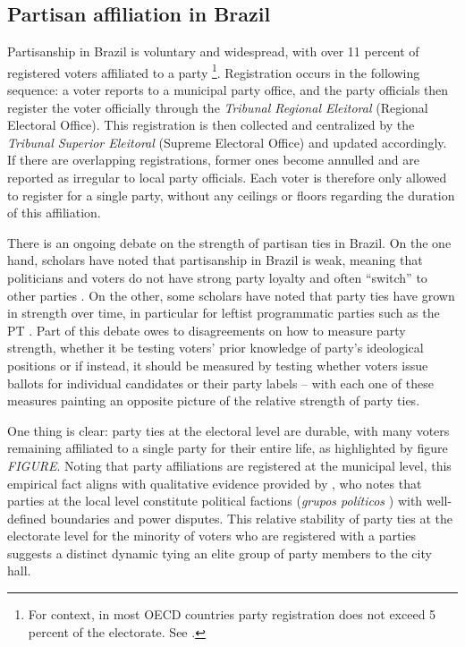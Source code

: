\subsection{Partisan affiliation in Brazil}

Partisanship in Brazil is voluntary and widespread, with over 11 percent of registered voters affiliated to a party \citep{speck2015estudo}\footnote{For context, in most OECD countries party registration does not exceed 5 percent of the electorate. See \citet{biezen2014decline}.}. Registration occurs in the following sequence: a voter reports to a municipal party office, and the party officials then register the voter officially through the \emph{Tribunal Regional Eleitoral} (Regional Electoral Office). This registration is then collected and centralized by the \emph{Tribunal Superior Eleitoral} (Supreme Electoral Office) and updated accordingly. If there are overlapping registrations, former ones become annulled and are reported as irregular to local party officials. Each voter is therefore only allowed to register for a single party, without any ceilings or floors regarding the duration of this affiliation.

There is an ongoing debate on the strength of partisan ties in Brazil. On the one hand, scholars have noted that partisanship in Brazil is weak, meaning that politicians and voters do not have strong party loyalty and often ``switch'' to other parties \citep{desposato2006parties,ames2002deadlock}. On the other, some scholars have noted that party ties have grown in strength over time, in particular for leftist programmatic parties such as the PT \citep{samuels2014power,samuels2006sources}. Part of this debate owes to disagreements on how to measure party strength, whether it be testing voters' prior knowledge of party's ideological positions or if instead, it should be measured by testing whether voters issue ballots for individual candidates or their party labels -- with each one of these measures painting an opposite picture of the relative strength of party ties.

One thing is clear: party ties at the electoral level are durable, with many voters remaining affiliated to a single party for their entire life, as highlighted by figure \emph{FIGURE}. Noting that party affiliations are registered at the municipal level, this empirical fact aligns with qualitative evidence provided by \citet{palmeira1995comicios}, who notes that parties at the local level constitute political factions (\emph{grupos pol\'{i}ticos} ) with well-defined boundaries and power disputes. This relative stability of party ties at the electorate level for the minority of voters who are registered with a parties suggests a distinct dynamic tying an elite group of party members to the city hall.

